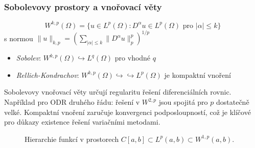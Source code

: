 \subsubsection{Sobolevovy prostory a vnořovací věty}

\begin{definition}
\[
W^{k,p}(\Omega) = \{ u \in L^p(\Omega) : D^\alpha u \in L^p(\Omega) \text{ pro } |\alpha| \leq k \}
\]
s normou $\|u\|_{k,p} = \left( \sum_{|\alpha| \leq k} \|D^\alpha u\|_p^p \right)^{1/p}$
\end{definition}

\begin{theorem}
\begin{itemize}
\item \emph{Sobolev}: $W^{k,p}(\Omega) \hookrightarrow L^q(\Omega)$ pro vhodné $q$
\item \emph{Rellich-Kondrachov}: $W^{k,p}(\Omega) \hookrightarrow\hookrightarrow L^p(\Omega)$ je kompaktní vnoření
\end{itemize}
\end{theorem}

\begin{keyinsight}
Sobolevovy vnořovací věty určují regularitu řešení diferenciálních rovnic. Například pro ODR druhého řádu: řešení v $W^{2,p}$ jsou spojitá pro $p$ dostatečně velké. Kompaktní vnoření zaručuje konvergenci podposloupností, což je klíčové pro důkazy existence řešení variačními metodami.
\end{keyinsight}

\begin{figure}[h]
    \centering
    \caption{Hierarchie funkcí v prostorech $C[a,b]\subset L^p(a,b)\subset W^{1,p}(a,b)$.}
    \label{fig:prostorova-hierarchie}
\end{figure}
        

